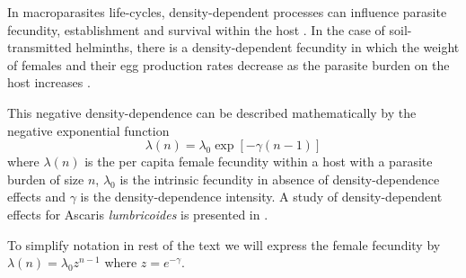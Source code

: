 \documentclass[useAMS,referee,usenatbib]{biom}
\begin{document}
In macroparasites life-cycles, density-dependent processes can influence parasite fecundity, establishment and survival within the host .  In the case of soil-transmitted helminths, there is a density-dependent fecundity in which the weight of females and their egg production rates decrease as the parasite burden on the host increases \cite{churcher2006density,walker2009density}.

This negative density-dependence can be described mathematically by the negative exponential function
\begin{equation}
\lambda(n)=\lambda_0 \exp[-\gamma(n-1)]
\end{equation} 
where $\lambda(n)$ is the per capita female fecundity within a host with a parasite burden of size $n$,
$\lambda_0$ is the intrinsic fecundity in absence of density-dependence effects and 
$\gamma$ is the density-dependence intensity. 
A study  of density-dependent effects for Ascaris \textit{lumbricoides} is presented in \cite{hall2000geographical}.

To simplify notation in rest of the text we will express the female fecundity by $\lambda(n)=\lambda_0 z^{n-1}$ where $z=e^{-\gamma}$.


\end{document}
